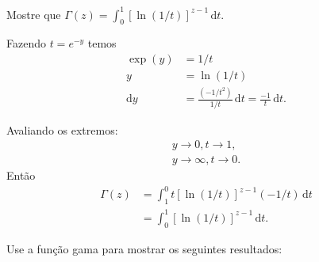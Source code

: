 \documentclass[a4paper,12pt, leqno, answers]{exam}
\begin{document}
\begin{questions}
    \question Mostre que $\Gamma(z) = \int_0^1 \left[ \ln(1/t) \right]^{z - 1} \,\mathrm{d}t$.
    \begin{solution}
        Fazendo $t = e^{-y}$ temos
        \begin{align*}
            \exp (y) &= 1 / t \\
            y &= \ln \left( 1 / t \right) \\
            \mathrm{d}y &= \frac{\left( - 1 / t^2 \right)}{1 / t} \,\mathrm{d}t = \frac{-1}{t} \,\mathrm{d}t.
        \end{align*}

        Avaliando os extremos:
        \begin{align*}
            y \to 0, t \to 1, \\
            y \to \infty, t \to 0.
        \end{align*}
        Ent\~{a}o
        \begin{align*}
            \Gamma(z) &= \int_1^0 t \left[ \ln \left( 1 / t \right) \right]^{z - 1} \left( -1 / t \right) \,\mathrm{d}t \\
            &= \int_0^1 \left[ \ln \left( 1 / t \right) \right]^{z - 1} \,\mathrm{d}t.
        \end{align*}
    \end{solution}

    \question Use a fun\c{c}\~{a}o gama para mostrar os seguintes resultados:
\end{questions}
\end{document}
